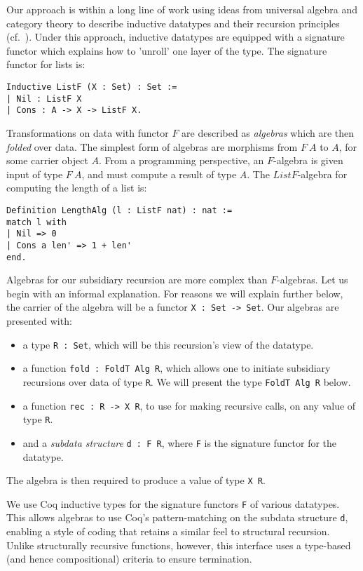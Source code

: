\documentclass[a4paper,USenglish]{lipics-v2021}
\begin{document}
Our approach is within a long line of work using ideas from universal
algebra and category theory to describe inductive datatypes and their
recursion principles (cf.~\cite{traytel12,cockett92,hagino87}). Under
this approach, inductive datatypes are equipped with a signature
functor which explains how to 'unroll' one layer of the type. The
signature functor for lists is:
\begin{verbatim}
Inductive ListF (X : Set) : Set :=
| Nil : ListF X
| Cons : A -> X -> ListF X.
\end{verbatim}
Transformations on data with functor $F$ are described as
\emph{algebras} which are then \textit{folded} over data.  The
simplest form of algebras are morphisms from $F\ A$ to $A$, for some
carrier object $A$.  From a programming perspective, an $F$-algebra is
given input of type $F\ A$, and must compute a result of type $A$. The
$ListF$-algebra for computing the length of a list is:
\begin{verbatim}
Definition LengthAlg (l : ListF nat) : nat :=
match l with
| Nil => 0
| Cons a len' => 1 + len'
end.
\end{verbatim}
Algebras for our subsidiary recursion are more complex than
$F$-algebras.  Let us begin with an informal explanation.  For reasons
we will explain further below, the carrier of the algebra will be a
functor \verb|X : Set -> Set|.  Our algebras are presented with:

\begin{itemize}
\item a type \verb|R : Set|, which will be this recursion's view of the datatype.
\item a function \verb|fold : FoldT Alg R|, which allows one to
  initiate subsidiary recursions over data of type \verb|R|.  We will
  present the type \verb|FoldT Alg R| below.
\item a function \verb|rec : R -> X R|, to use for making recursive calls, on any value of type \verb|R|.
\item and a \emph{subdata structure} \verb|d : F R|, where \verb|F| is the signature functor for the datatype.
\end{itemize}

\noindent The algebra is then required to produce a value of type \verb|X R|.

We use Coq inductive types for the signature functors \verb|F| of
various datatypes. This allows algebras to use Coq's
pattern-matching on the subdata structure \verb|d|, enabling a style
of coding that retains a similar feel to structural recursion. Unlike
structurally recursive functions, however, this interface uses a
type-based (and hence compositional) criteria to ensure termination.
\end{document}
